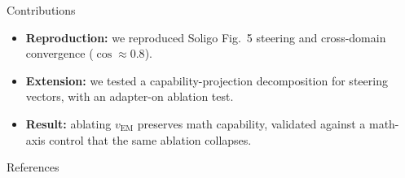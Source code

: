 \documentclass[final]{beamer}
\newcommand{\vEM}{v_{\mathrm{EM}}}
\newlength{\sepwidth}
\newlength{\colwidth}
\newcommand{\separatorcolumn}{\begin{column}{\sepwidth}\end{column}}
\begin{document}
\begin{frame}[t]
\begin{columns}[t]
\begin{column}{\colwidth}
  \begin{block}{Contributions}

    \begin{itemize}
      \item \textbf{Reproduction:} we reproduced Soligo Fig.~5 steering and cross-domain
        convergence ($\cos\!\approx\!0.8$).
      \item \textbf{Extension:} we tested a capability-projection decomposition for steering
        vectors, with an adapter-on ablation test.
      \item \textbf{Result:} ablating $\vEM$ preserves math capability,
        validated against a math-axis control that the same ablation collapses.
    \end{itemize}

  \end{block}

  \begin{block}{References}

    

  \end{block}

\end{column}

\separatorcolumn
\end{columns}
\end{frame}
\end{document}
